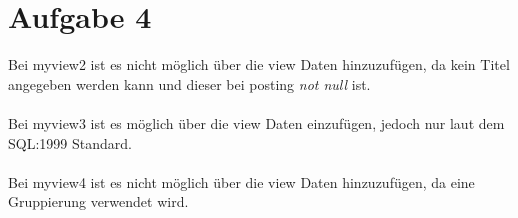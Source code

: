 \pagebreak
\section*{Aufgabe 4}

Bei myview2 ist es nicht möglich über die view Daten hinzuzufügen, da kein Titel angegeben werden kann und dieser bei posting \emph{not null} ist.\\\\
Bei myview3 ist es möglich über die view Daten einzufügen, jedoch nur laut dem SQL:1999 Standard.\\\\
Bei myview4 ist es nicht möglich über die view Daten hinzuzufügen, da eine Gruppierung verwendet wird.\\\\